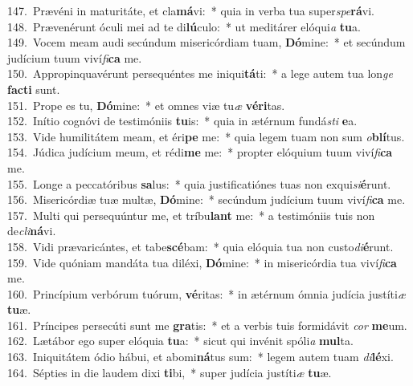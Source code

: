 {147.~}Prævéni in maturitáte, et cla\textbf{má}vi:~* quia in verba tua super\textit{spe}\textbf{rá}vi.\\
{148.~}Prævenérunt óculi mei ad te di\textbf{lú}culo:~* ut meditárer elóqui\textit{a} \textbf{tu}a.\\
{149.~}Vocem meam audi secúndum misericórdiam tuam, \textbf{Dó}mine:~* et secúndum judícium tuum viví\textit{fi}\textbf{ca} me.\\
{150.~}Appropinquavérunt persequéntes me iniqui\textbf{tá}ti:~* a lege autem tua lon\textit{ge} \textbf{fa}\textbf{cti} sunt.\\
{151.~}Prope es tu, \textbf{Dó}mine:~* et omnes viæ tu\textit{æ} \textbf{vé}\textbf{ri}tas.\\
{152.~}Inítio cognóvi de testimóniis \textbf{tu}is:~* quia in ætérnum fundá\textit{sti} \textbf{e}a.\\
{153.~}Vide humilitátem meam, et éri\textbf{pe} me:~* quia legem tuam non sum \textit{o}\textbf{blí}tus.\\
{154.~}Júdica judícium meum, et rédi\textbf{me} me:~* propter elóquium tuum viví\textit{fi}\textbf{ca} me.\\
{155.~}Longe a peccatóribus \textbf{sa}lus:~* quia justificatiónes tuas non exqui\textit{si}\textbf{é}runt.\\
{156.~}Misericórdiæ tuæ multæ, \textbf{Dó}mine:~* secúndum judícium tuum viví\textit{fi}\textbf{ca} me.\\
{157.~}Multi qui persequúntur me, et tríbu\textbf{lant} me:~* a testimóniis tuis non de\textit{cli}\textbf{ná}vi.\\
{158.~}Vidi prævaricántes, et tabe\textbf{scé}bam:~* quia elóquia tua non custo\textit{di}\textbf{é}runt.\\
{159.~}Vide quóniam mandáta tua diléxi, \textbf{Dó}mine:~* in misericórdia tua viví\textit{fi}\textbf{ca} me.\\
{160.~}Princípium verbórum tuórum, \textbf{vé}ritas:~* in ætérnum ómnia judícia justíti\textit{æ} \textbf{tu}æ.\\
{161.~}Príncipes persecúti sunt me \textbf{gra}tis:~* et a verbis tuis formidávit \textit{cor} \textbf{me}um.\\
{162.~}Lætábor ego super elóquia \textbf{tu}a:~* sicut qui invénit spóli\textit{a} \textbf{mul}ta.\\
{163.~}Iniquitátem ódio hábui, et abomi\textbf{ná}tus sum:~* legem autem tuam \textit{di}\textbf{lé}xi.\\
{164.~}Sépties in die laudem dixi \textbf{ti}bi,~* super judícia justíti\textit{æ} \textbf{tu}æ.\\
